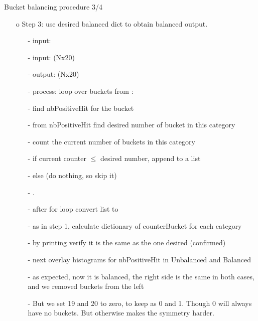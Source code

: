\documentclass{beamer}
\begin{document}
\begin{frame}{Bucket balancing procedure 3/4}
\begin{enumerate}
\item[o] Step 3: use desired balanced dict to obtain balanced output.
\begin{enumerate}
\item[-] input: \texttt{}
\item[-] input: \texttt{} (Nx20)
\item[-] output: \texttt{} (Nx20)
\item[-] process: loop over buckets from \texttt{}:
\item[-] find nbPositiveHit for the bucket
\item[-] from nbPositiveHit find desired number of bucket in this category
\item[-] count the current number of buckets in this category
\item[-] if current counter $\le$ desired number, append to a list
\item[-] else (do nothing, so skip it)
\item[-] .
\item[-] after for loop convert list to \texttt{}
\item[-] as in step 1, calculate dictionary of counterBucket for each category
\item[-] by printing verify it is the same as the one desired (confirmed)
\item[-] next overlay histograms for nbPositiveHit in Unbalanced and Balanced
\item[-] as expected, now it is balanced, the right side is the same in both cases, and we removed buckets from the left
\item[-] But we set 19 and 20 to zero, to keep as 0 and 1. Though 0 will always have no buckets. But otherwise makes the symmetry harder.
\end{enumerate}
\end{enumerate}
\end{frame}
\end{document}
